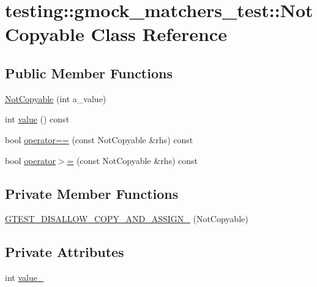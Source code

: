 \hypertarget{classtesting_1_1gmock__matchers__test_1_1_not_copyable}{}\section{testing\+::gmock\+\_\+matchers\+\_\+test\+::Not\+Copyable Class Reference}
\label{classtesting_1_1gmock__matchers__test_1_1_not_copyable}
\subsection*{Public Member Functions}
\begin{DoxyCompactItemize}
\item 
\mbox{\hyperlink{classtesting_1_1gmock__matchers__test_1_1_not_copyable_a3d15763c115415a26d8acc9ce5a26e19}{Not\+Copyable}} (int a\+\_\+value)
\item 
int \mbox{\hyperlink{classtesting_1_1gmock__matchers__test_1_1_not_copyable_af6c134767462948fa8dbd35c68370004}{value}} () const
\item 
bool \mbox{\hyperlink{classtesting_1_1gmock__matchers__test_1_1_not_copyable_a2e68fcd9a588a184d54e6b54e41fb978}{operator==}} (const Not\+Copyable \&rhs) const
\item 
bool \mbox{\hyperlink{classtesting_1_1gmock__matchers__test_1_1_not_copyable_a36eb6a25f5559bee00fe52a6d86b42d6}{operator$>$=}} (const Not\+Copyable \&rhs) const
\end{DoxyCompactItemize}
\subsection*{Private Member Functions}
\begin{DoxyCompactItemize}
\item 
\mbox{\hyperlink{classtesting_1_1gmock__matchers__test_1_1_not_copyable_af82cf7cef1eb3f1eb59850e34910fe2b}{G\+T\+E\+S\+T\+\_\+\+D\+I\+S\+A\+L\+L\+O\+W\+\_\+\+C\+O\+P\+Y\+\_\+\+A\+N\+D\+\_\+\+A\+S\+S\+I\+G\+N\+\_\+}} (Not\+Copyable)
\end{DoxyCompactItemize}
\subsection*{Private Attributes}
\begin{DoxyCompactItemize}
\item 
int \mbox{\hyperlink{classtesting_1_1gmock__matchers__test_1_1_not_copyable_ad39e5f41c6359a24bca90fb734dd0f89}{value\+\_\+}}
\end{DoxyCompactItemize}


